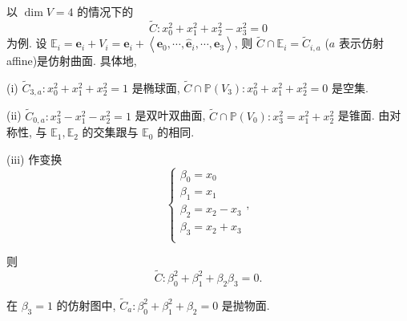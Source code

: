 \documentclass{ctexart}
\begin{document}
以 $\dim V=4$ 的情况下的
\[\widetilde{C}:x_0^2+x_1^2+x_2^2-x_3^2=0\]
为例. 设 $\mathbb{E}_i=\boldsymbol{e}_i+V_i=\boldsymbol{e}_i+\left<\boldsymbol{e}_0,\cdots,\hat{\boldsymbol{e}}_i,\cdots,\boldsymbol{e}_3\right>$, 则 $\widetilde{C}\cap\mathbb{E}_i=\widetilde{C}_{i,a}$ ($a$ 表示仿射 affine)是仿射曲面. 具体地,

(i) $\widetilde{C}_{3,a}:x_0^2+x_1^2+x_2^2=1$ 是椭球面, $\widetilde{C}\cap\mathbb{P}(V_3):x_0^2+x_1^2+x_2^2=0$ 是空集.

(ii) $\widetilde{C}_{0,a}:x_3^2-x_1^2-x_2^2=1$ 是双叶双曲面, $\widetilde{C}\cap\mathbb{P}(V_0):x_3^2=x_1^2+x_2^2$ 是锥面. 由对称性, 与 $\mathbb{E}_1,\mathbb{E}_2$ 的交集跟与 $\mathbb{E}_0$ 的相同.

(iii) 作变换
\[\begin{cases}
    \beta_0=x_0 \\
    \beta_1=x_1 \\
    \beta_2=x_2-x_3 \\
    \beta_3=x_2+x_3 \\
\end{cases},\]

则
\[\widetilde{C}:\beta_0^2+\beta_1^2+\beta_2\beta_3=0.\]

在 $\beta_3=1$ 的仿射图中, $\widetilde{C}_a:\beta_0^2+\beta_1^2+\beta_2=0$ 是抛物面.
\end{document}
